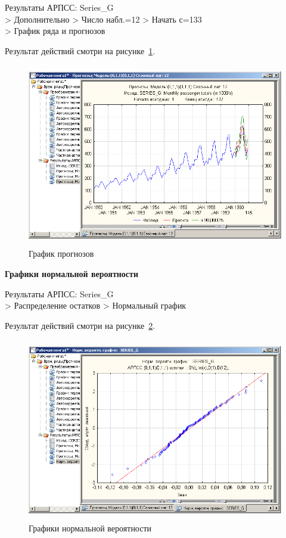 
\newpage

Результаты АРПСС: Series\_G\\
> Дополнительно
> Число набл.=12
> Начать с=133\\
> График ряда и прогнозов

Результат действий смотри на рисунке~\ref{fig:16}.

\begin{figure}[!h]
  \centering

  \includegraphics[height=8cm]
  {inc/16.PNG}

  \caption{График прогнозов}

  \label{fig:16}
\end{figure}

\begin{center}
  \textbf{Графики нормальной вероятности}
\end{center}

Результаты АРПСС: Series\_G\\
> Распределение остатков
> Нормальный график

Результат действий смотри на рисунке~\ref{fig:17}.

\begin{figure}[!h]
  \centering

  \includegraphics[height=8cm]
  {inc/17.PNG}

  \caption{Графики нормальной вероятности}

  \label{fig:17}
\end{figure}


